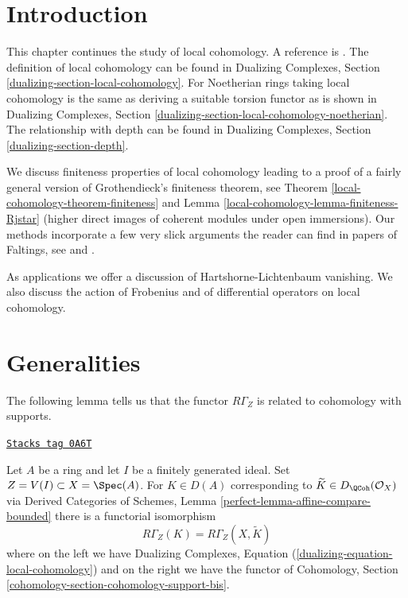 \section{Introduction}
\label{local-cohomology-section-introduction}
This chapter continues the study of local cohomology.
A reference is \cite{SGA2}.
The definition of local cohomology can be found in
Dualizing Complexes, Section \ref{dualizing-section-local-cohomology}.
For Noetherian rings taking local cohomology is the same
as deriving a suitable torsion functor as is shown in
Dualizing Complexes, Section
\ref{dualizing-section-local-cohomology-noetherian}.
The relationship with depth can be found in
Dualizing Complexes, Section
\ref{dualizing-section-depth}.

\medskip\noindent
We discuss finiteness properties of local cohomology leading to a proof
of a fairly general version of
Grothendieck's finiteness theorem, see Theorem \ref{local-cohomology-theorem-finiteness}
and Lemma \ref{local-cohomology-lemma-finiteness-Rjstar} (higher direct images
of coherent modules under open immersions).
Our methods incorporate a few very slick arguments the reader
can find in papers of Faltings, see
\cite{Faltings-annulators} and \cite{Faltings-finiteness}.

\medskip\noindent
As applications we offer a discussion of
Hartshorne-Lichtenbaum vanishing. We also discuss
the action of Frobenius and of differential operators
on local cohomology.

\section{Generalities}
\label{local-cohomology-section-generalities}
The following lemma tells us that the functor $R\Gamma_Z$
is related to cohomology with supports.

\begin{lemma}
\label{local-cohomology-lemma-local-cohomology-is-local-cohomology}
\href{https://stacks.math.columbia.edu/tag/0A6T}{\texttt{Stacks tag 0A6T}}

Let $A$ be a ring and let $I$ be a finitely generated ideal.
Set $Z = V(I) \subset X = \Spec(A)$. For $K \in D(A)$ corresponding
to $\widetilde{K} \in D_\QCoh(\mathcal{O}_X)$ via
Derived Categories of Schemes, Lemma \ref{perfect-lemma-affine-compare-bounded}
there is a functorial isomorphism
$$
R\Gamma_Z(K) = R\Gamma_Z(X, \widetilde{K})
$$
where on the left we have
Dualizing Complexes, Equation (\ref{dualizing-equation-local-cohomology})
and on the right we have the functor of
Cohomology, Section \ref{cohomology-section-cohomology-support-bis}.
\end{lemma}

